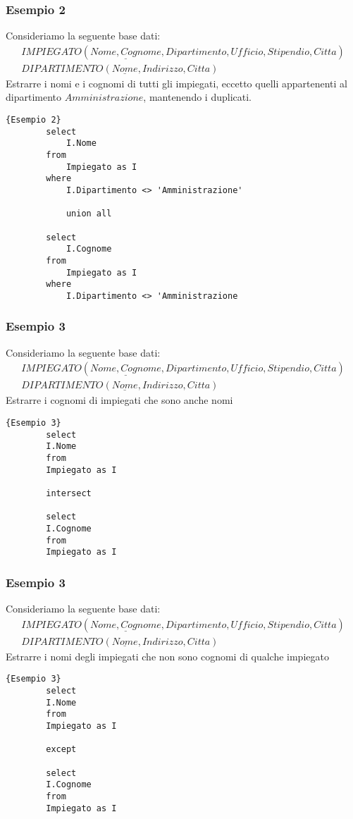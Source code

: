 \subsubsection{Esempio 2}
Consideriamo la seguente base dati:
	\begin{equation}\begin{aligned}
		IMPIEGATO (\underline{Nome, Cognome}, Dipartimento, Ufficio, Stipendio, Citta)\\
		DIPARTIMENTO (\underline{Nome}, Indirizzo, Citta)
	\end{aligned}\end{equation}
Estrarre i nomi e i cognomi di tutti gli impiegati, eccetto quelli appartenenti al dipartimento $Amministrazione$, mantenendo i duplicati.
	\begin{lstlisting}{Esempio 2}
		select 
			I.Nome
		from
			Impiegato as I
		where 
			I.Dipartimento <> 'Amministrazione'
			
			union all
			
		select
			I.Cognome
		from
			Impiegato as I
		where
			I.Dipartimento <> 'Amministrazione
	\end{lstlisting}

\subsubsection{Esempio 3}
Consideriamo la seguente base dati:
	\begin{equation}\begin{aligned}
	IMPIEGATO (\underline{Nome, Cognome}, Dipartimento, Ufficio, Stipendio, Citta)\\
	DIPARTIMENTO (\underline{Nome}, Indirizzo, Citta)
	\end{aligned}\end{equation}
Estrarre i cognomi di impiegati che sono anche nomi
	\begin{lstlisting}{Esempio 3}
		select 
		I.Nome
		from
		Impiegato as I
	
		intersect
	
		select
		I.Cognome
		from
		Impiegato as I
	\end{lstlisting}

\subsubsection{Esempio 3}
Consideriamo la seguente base dati:
	\begin{equation}\begin{aligned}
		IMPIEGATO (\underline{Nome, Cognome}, Dipartimento, Ufficio, Stipendio, Citta)\\
		DIPARTIMENTO (\underline{Nome}, Indirizzo, Citta)
	\end{aligned}\end{equation}
Estrarre i nomi degli impiegati che non sono cognomi di qualche impiegato
	\begin{lstlisting}{Esempio 3}
		select 
		I.Nome
		from
		Impiegato as I
		
		except
		
		select
		I.Cognome
		from
		Impiegato as I
	\end{lstlisting}


